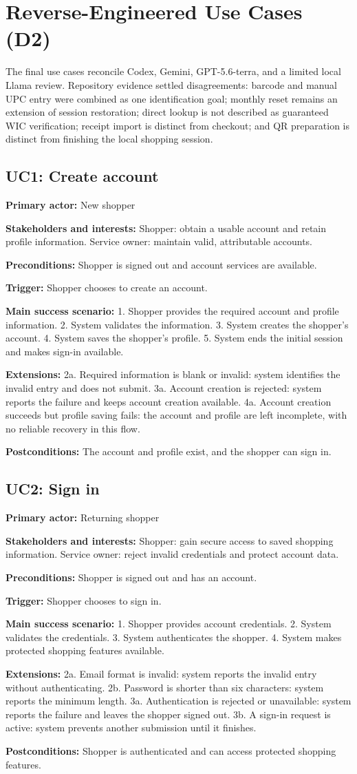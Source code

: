\documentclass[sigconf]{acmart}
\begin{document}
\section{Reverse-Engineered Use Cases (D2)}

The final use cases reconcile Codex, Gemini, GPT-5.6-terra, and a limited local
Llama review. Repository evidence settled disagreements: barcode and manual UPC
entry were combined as one identification goal; monthly reset remains an
extension of session restoration; direct lookup is not described as guaranteed
WIC verification; receipt import is distinct from checkout; and QR preparation
is distinct from finishing the local shopping session.

\newcommand{\ucfield}[2]{\noindent\textbf{#1:} #2\par}

\subsection{UC1: Create account}
\ucfield{Primary actor}{New shopper}
\ucfield{Stakeholders and interests}{Shopper: obtain a usable account and retain profile information. Service owner: maintain valid, attributable accounts.}
\ucfield{Preconditions}{Shopper is signed out and account services are available.}
\ucfield{Trigger}{Shopper chooses to create an account.}
\ucfield{Main success scenario}{1. Shopper provides the required account and profile information. 2. System validates the information. 3. System creates the shopper's account. 4. System saves the shopper's profile. 5. System ends the initial session and makes sign-in available.}
\ucfield{Extensions}{2a. Required information is blank or invalid: system identifies the invalid entry and does not submit. 3a. Account creation is rejected: system reports the failure and keeps account creation available. 4a. Account creation succeeds but profile saving fails: the account and profile are left incomplete, with no reliable recovery in this flow.}
\ucfield{Postconditions}{The account and profile exist, and the shopper can sign in.}

\subsection{UC2: Sign in}
\ucfield{Primary actor}{Returning shopper}
\ucfield{Stakeholders and interests}{Shopper: gain secure access to saved shopping information. Service owner: reject invalid credentials and protect account data.}
\ucfield{Preconditions}{Shopper is signed out and has an account.}
\ucfield{Trigger}{Shopper chooses to sign in.}
\ucfield{Main success scenario}{1. Shopper provides account credentials. 2. System validates the credentials. 3. System authenticates the shopper. 4. System makes protected shopping features available.}
\ucfield{Extensions}{2a. Email format is invalid: system reports the invalid entry without authenticating. 2b. Password is shorter than six characters: system reports the minimum length. 3a. Authentication is rejected or unavailable: system reports the failure and leaves the shopper signed out. 3b. A sign-in request is active: system prevents another submission until it finishes.}
\ucfield{Postconditions}{Shopper is authenticated and can access protected shopping features.}
\end{document}
